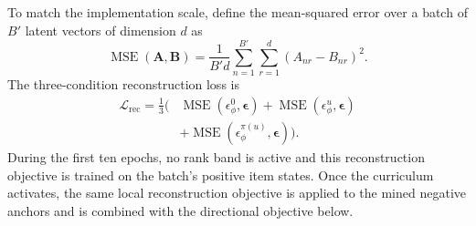 \documentclass[sigconf,anonymous,review]{acmart}
\begin{document}
To match the implementation scale, define the mean-squared error over a batch of $B'$ latent vectors of dimension $d$ as
\begin{equation}
    \operatorname{MSE}(\mathbf{A},\mathbf{B})
    =
    \frac{1}{B'd}
    \sum_{n=1}^{B'}
    \sum_{r=1}^{d}
    (A_{nr}-B_{nr})^2.
\end{equation}
The three-condition reconstruction loss is
\begin{equation}
\begin{split}
    \mathcal{L}_{\mathrm{rec}}
    =\frac{1}{3}\big(&
    \operatorname{MSE}(\epsilon_{\phi}^{0},\boldsymbol{\epsilon})
    +\operatorname{MSE}(\epsilon_{\phi}^{u},\boldsymbol{\epsilon})\\
    &+\operatorname{MSE}(\epsilon_{\phi}^{\pi(u)},\boldsymbol{\epsilon})
    \big).
    \label{eq:diff-rec}
\end{split}
\end{equation}
During the first ten epochs, no rank band is active and this reconstruction objective is trained on the batch's positive item states.
Once the curriculum activates, the same local reconstruction objective is applied to the mined negative anchors and is combined with the directional objective below.
\end{document}
